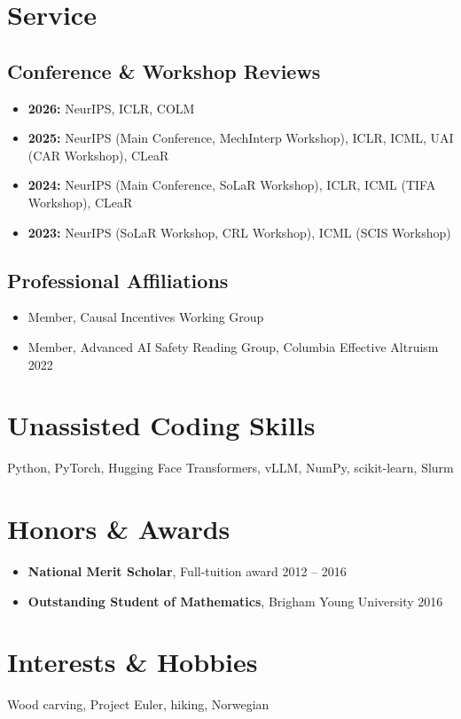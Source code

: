 \documentclass[11pt,letterpaper]{article}
\begin{document}
\section*{Service}

\subsection*{Conference \& Workshop Reviews}

\begin{itemize}[leftmargin=*]
    \item \textbf{2026:} NeurIPS, ICLR, COLM
    \item \textbf{2025:} NeurIPS (Main Conference, MechInterp Workshop), ICLR, ICML, UAI (CAR Workshop), CLeaR
    \item \textbf{2024:} NeurIPS (Main Conference, SoLaR Workshop), ICLR, ICML (TIFA Workshop), CLeaR
    \item \textbf{2023:} NeurIPS (SoLaR Workshop, CRL Workshop), ICML (SCIS Workshop)
\end{itemize}

\subsection*{Professional Affiliations}

\begin{itemize}[leftmargin=*]
    \item Member, Causal Incentives Working Group
    \item Member, Advanced AI Safety Reading Group, Columbia Effective Altruism \hfill 2022
\end{itemize}

\section*{Unassisted Coding Skills}

\noindent Python, PyTorch, Hugging Face Transformers, vLLM, NumPy, scikit-learn, Slurm

\section*{Honors \& Awards}

\begin{itemize}[leftmargin=*]
    \item \textbf{National Merit Scholar}, Full-tuition award \hfill 2012 -- 2016
    \item \textbf{Outstanding Student of Mathematics}, Brigham Young University \hfill 2016
\end{itemize}

\section*{Interests \& Hobbies}

\noindent Wood carving, Project Euler, hiking, Norwegian
\end{document}
